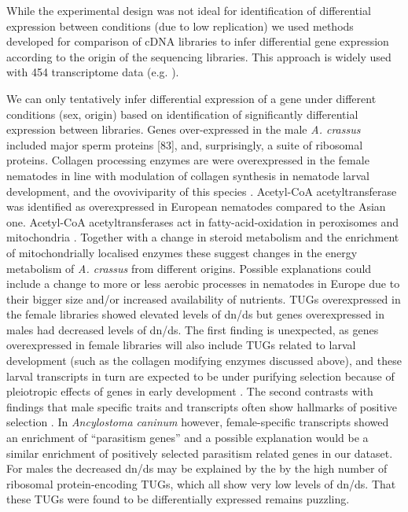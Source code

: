 \documentclass[10pt]{bmc_article}
\newenvironment{bmcformat}{\begin{raggedright}\baselineskip20pt\sloppy\setboolean{publ}{false}}{\end{raggedright}\baselineskip20pt\sloppy}
\begin{document}
\begin{bmcformat}
While the experimental design was not ideal for identification of
differential expression between conditions (due to low replication) we
used methods developed for comparison of cDNA libraries
\cite{pmid9331369} to infer differential gene expression according to
the origin of the sequencing libraries. This approach is widely used
with 454 transcriptome data (e.g. \cite{pmid20470405}).

We can only tentatively infer differential expression of a gene under
different conditions (sex, origin) based on identification of
significantly differential expression between libraries. Genes
over-expressed in the male \textit{A. crassus} included major sperm
proteins [83], and, surprisingly, a suite of ribosomal
proteins. Collagen processing enzymes are were overexpressed in the
female nematodes in line with modulation of collagen synthesis in
nematode larval development, and the ovoviviparity of this species
\cite{pmid10637627}. Acetyl-CoA acetyltransferase was identified as
overexpressed in European nematodes compared to the Asian
one. Acetyl-CoA acetyltransferases act in fatty-acid-oxidation in
peroxisomes and mitochondria \cite{pmid4721607}. Together with a
change in steroid metabolism and the enrichment of mitochondrially
localised enzymes these suggest changes in the energy metabolism of
\textit{A. crassus} from different origins. Possible explanations
could include a change to more or less aerobic processes in nematodes
in Europe due to their bigger size and/or increased availability of
nutrients.  TUGs overexpressed in the female libraries showed elevated
levels of dn/ds but genes overexpressed in males had decreased levels
of dn/ds. The first finding is unexpected, as genes overexpressed in
female libraries will also include TUGs related to larval development
(such as the collagen modifying enzymes discussed above), and these
larval transcripts in turn are expected to be under purifying
selection because of pleiotropic effects of genes in early development
\cite{pmid15371532}. The second contrasts with findings that male
specific traits and transcripts often show hallmarks of positive
selection \cite{pmid15795858, pmid11404480}. In \textit{Ancylostoma
  caninum} however, female-specific transcripts showed an enrichment
of “parasitism genes'' \cite{pmid20470405} and a possible explanation
would be a similar enrichment of positively selected parasitism
related genes in our dataset. For males the decreased dn/ds may be
explained by the by the high number of ribosomal protein-encoding
TUGs, which all show very low levels of dn/ds. That these TUGs were
found to be differentially expressed remains puzzling.


\end{bmcformat}
\end{document}
